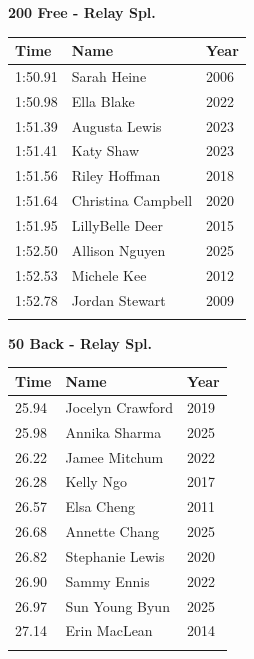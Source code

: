 \vspace{1.2em}
\noindent\begin{minipage}[t]{0.48\textwidth}
\centering
\textbf{\textcolor{teamprimary}{200 Free - Relay Spl.}}\par
\vspace{0.5em}
\centering
\small
\renewcommand{\arraystretch}{1.0}
\setlength{\tabcolsep}{4pt}
\begin{tabular}{@{}p{1.8cm}p{3.0cm}p{1.0cm}@{}}
\toprule
\textbf{Time} & \textbf{Name} & \textbf{Year} \\
\midrule
1:50.91 & Sarah Heine & 2006 \\
1:50.98 & Ella Blake & 2022 \\
1:51.39 & Augusta Lewis & 2023 \\
1:51.41 & Katy Shaw & 2023 \\
1:51.56 & Riley Hoffman & 2018 \\
1:51.64 & Christina Campbell & 2020 \\
1:51.95 & LillyBelle Deer & 2015 \\
1:52.50 & Allison Nguyen & 2025 \\
1:52.53 & Michele Kee & 2012 \\
1:52.78 & Jordan Stewart & 2009 \\
\bottomrule
\vspace{0.5em}
\end{tabular}
\end{minipage}
\hfill
\begin{minipage}[t]{0.48\textwidth}
\centering
\textbf{\textcolor{teamprimary}{50 Back - Relay Spl.}}\par
\vspace{0.5em}
\centering
\small
\renewcommand{\arraystretch}{1.0}
\setlength{\tabcolsep}{4pt}
\begin{tabular}{@{}p{1.8cm}p{3.0cm}p{1.0cm}@{}}
\toprule
\textbf{Time} & \textbf{Name} & \textbf{Year} \\
\midrule
25.94 & Jocelyn Crawford & 2019 \\
25.98 & Annika Sharma & 2025 \\
26.22 & Jamee Mitchum & 2022 \\
26.28 & Kelly Ngo & 2017 \\
26.57 & Elsa Cheng & 2011 \\
26.68 & Annette Chang & 2025 \\
26.82 & Stephanie Lewis & 2020 \\
26.90 & Sammy Ennis & 2022 \\
26.97 & Sun Young Byun & 2025 \\
27.14 & Erin MacLean & 2014 \\
\bottomrule
\vspace{0.5em}
\end{tabular}
\end{minipage}
